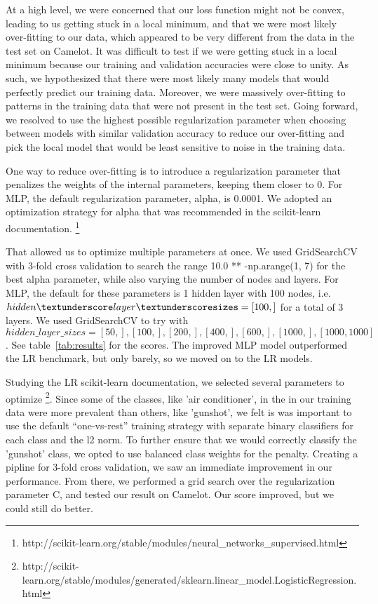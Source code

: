 \documentclass[11pt]{article}
\begin{document}
At a high level, we were concerned that our loss function might not be convex, leading to us getting stuck in a local minimum, and that we were most likely over-fitting to our data, which appeared to be very different from the data in the test set on Camelot. It was difficult to test if we were getting stuck in a local minimum because our training and validation accuracies were close to unity. As such, we hypothesized that there were most likely many models that would perfectly predict our training data. Moreover, we were massively over-fitting to patterns in the training data that were not present in the test set. Going forward, we resolved to use the highest possible regularization parameter when choosing between models with similar validation accuracy to reduce our over-fitting and pick the local model that would be least sensitive to noise in the training data.

One way to reduce over-fitting is to introduce a regularization parameter that penalizes the weights of the internal parameters, keeping them closer to 0. For MLP, the default regularization parameter, alpha, is 0.0001.  We adopted an optimization strategy for alpha that was recommended in the scikit-learn documentation. \footnote{http://scikit-learn.org/stable/modules/neural\_networks\_supervised.html} 

That allowed us to optimize multiple parameters at once. We used GridSearchCV with 3-fold cross validation to search the range 10.0 ** -np.arange(1, 7) for the best alpha parameter, while also varying the number of nodes and layers. For MLP, the default for these parameters is 1 hidden layer with 100 nodes, i.e. $hidden \textunderscore layer\textunderscoresizes = [100,]$ for a total of 3 layers. We used GridSearchCV to try with $hidden\_layer\_sizes = {[50,], [100,], [200,], [400,], [600,], [1000,], [1000,1000]}$. See table~\ref{tab:results} for the scores. The improved MLP model outperformed the LR benchmark, but only barely, so we moved on to the LR models. 

Studying the LR scikit-learn documentation, we selected several parameters to optimize \footnote{http://scikit-learn.org/stable/modules/generated/sklearn.linear\_model.LogisticRegression.html}. Since some of the classes, like 'air conditioner', in the in our training data were more prevalent than others, like 'gunshot', we felt is was important to use the default “one-vs-rest” training strategy with separate binary classifiers for each class and the l2 norm. To further ensure that we would correctly classify the 'gunshot' class, we opted to use balanced class weights for the penalty. Creating a pipline for 3-fold cross validation, we saw an immediate improvement in our performance. From there, we performed a grid search over the regularization parameter C, and tested our result on Camelot. Our score improved, but we could still do better. 
\end{document}
